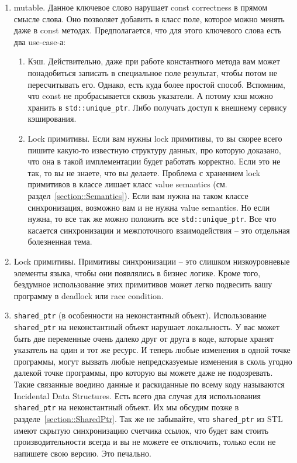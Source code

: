 \begin{enumerate}
\item mutable.
Данное ключевое слово нарушает const correctness в прямом смысле слова.
Оно позволяет добавить в класс поле, которое можно менять даже в const методах.
Предполагается, что для этого ключевого слова есть два use-case-а:
\begin{enumerate}
\item Кэш.
Действительно, даже при работе константного метода вам может понадобиться записать в специальное поле результат, чтобы потом не пересчитывать его.
Однако, есть куда более простой способ.
Вспомним, что const не пробрасывается сквозь указатели.
А потому кэш можно хранить в \verb"std::unique_ptr".
Либо получать доступ к внешнему сервису кэширования.

\item Lock примитивы.
Если вам нужны lock примитивы, то вы скорее всего пишите какую-то известную структуру данных, про которую доказано, что она в такой имплементации будет работать корректно.
Если это не так, то вы не знаете, что вы делаете.
Проблема с хранением lock примитивов в классе лишает класс value semantics (см. раздел~\ref{section::Semantics}).
Если вам нужна на таком классе синхронизация, возможно вам и не нужна value semantics.
Но если нужна, то все так же можно положить все \verb"std::unique_ptr".
Все что касается синхронизации и межпоточного взаимодействия -- это отдельная болезненная тема.
\end{enumerate}

\item Lock примитивы.
Примитивы синхронизации -- это слишком низкоуровневые элементы языка, чтобы они появлялись в бизнес логике.
Кроме того, бездумное использование этих примитивов может легко подвесить вашу программу в deadlock или race condition.

\item \label{item::SharedPtr}
\verb"shared_ptr" (в особенности на неконстантный объект).
Использование \verb"shared_ptr" на неконстантный объект нарушает локальность.
У вас может быть две переменные очень далеко друг от друга в коде, которые хранят указатель на один и тот же ресурс.
И теперь любые изменения в одной точке программы, могут вызвать любые непредсказуемые изменения в сколь угодно далекой точке программы, про которую вы можете даже не подозревать.
Такие связанные воедино данные и раскиданные по всему коду называются Incidental Data Structures.
Есть всего два случая для использования \verb"shared_ptr" на неконстантный объект.
Их мы обсудим позже в разделе~\ref{section::SharedPtr}.
Так же не забывайте, что \verb"shared_ptr" из STL имеют скрытую синхронизацию счетчика ссылок, что будет вам стоить производительности всегда и вы не можете ее отключить, только если не напишете свою версию.
Это печально.


\end{enumerate}
